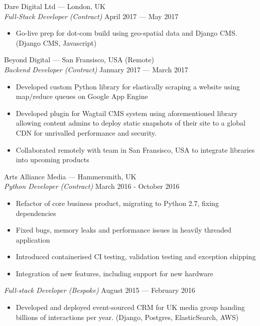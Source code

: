 \documentclass[margin, 10pt]{res}
\begin{document}
\begin{resume}
Dare Digital Ltd --- London, UK \\
{\sl Full-Stack Developer (Contract)} \hfill April 2017 --- May 2017 \\
\begin{itemize} \itemsep -1pt
\item Go-live prep for dot-com build using geo-spatial data and Django CMS. (Django CMS, Javascript)
\end{itemize}

Beyond Digital --- San Fransisco, USA (Remote) \\
{\sl Backend Developer (Contract)} \hfill January 2017 --- March 2017 \\

\begin{itemize} \itemsep -1pt
\item Developed custom Python library for elastically scraping a website using map/reduce queues on Google App Engine
\item Developed plugin for Wagtail CMS system using aforementioned library allowing content admins to deploy static snapshots of their site to a global CDN for unrivalled performance and security.
\item Collaborated remotely with team in San Fransisco, USA to integrate libraries into upcoming products
\end{itemize}

Arts Alliance Media --- Hammersmith, UK \\
{\sl Python Developer (Contract)} \hfill March 2016 - October 2016 \\

\begin{itemize} \itemsep -1pt
\item Refactor of core business product, migrating to Python 2.7, fixing dependencies
\item Fixed bugs, memory leaks and performance issues in heavily threaded application
\item Introduced containerised CI testing, validation testing and exception shipping
\item Integration of new features, including support for new hardware
\end{itemize}

{\sl Full-stack Developer (Bespoke)} \hfill August 2015 --- February 2016 \\

\begin{itemize}
\item Developed and deployed event-sourced CRM for UK media group handing billions of
interactions per year. (Django, Postgres, ElasticSearch, AWS)
\end{itemize}


\end{resume}
\end{document}
